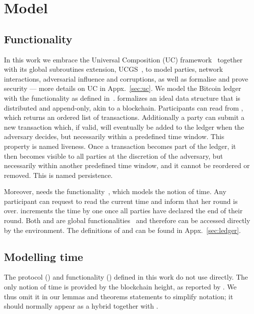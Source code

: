 \section{Model}

  \subsection{\ledger Functionality}
  In this work we embrace the Universal Composition (UC) framework~\cite{uc}
  together with its global subroutines extension,
  UCGS~\cite{DBLP:conf/tcc/BadertscherCHTZ20}, to
  model parties, network interactions, adversarial influence and corruptions, as
  well as formalise and prove security --- more details on UC in
  Appx.~\ref{sec:uc}. We model the Bitcoin ledger with the \ledger
  functionality as defined in~\cite{BMTZ17,genesis}. \ledger formalizes an ideal
  data structure that is
  distributed and append-only, akin to a blockchain. Participants can read from
  \ledger, which returns an ordered list of transactions. Additionally a party
  can submit a new transaction which, if valid, will eventually be added to the
  ledger when the adversary decides, but necessarily within a predefined time
  window. This property is named liveness. Once a transaction becomes part of
  the ledger, it then becomes visible to all parties at the discretion of the
  adversary, but necessarily within another predefined time window, and it
  cannot be reordered or removed. This is named persistence.

  Moreover, \ledger needs the \Fclock
  functionality~\cite{DBLP:conf/tcc/KatzMTZ13}, which models the notion of time.
  Any \Fclock participant can request to read the current time and inform \Fclock that her round is over. \Fclock increments the
  time by one once all parties have declared the end of their round. Both
  \ledger and \Fclock are global
  functionalities~\cite{DBLP:conf/tcc/BadertscherCHTZ20} and therefore can be
  accessed directly by the environment. The definitions of \ledger and \Fclock
  can be found in Appx.~\ref{sec:ledger}.

  \subsection{Modelling time}
  The protocol (\pchan) and functionality (\fchan) defined in this work do not use \Fclock
  directly. The only notion of time is provided by the
  blockchain height, as reported by \ledger. We thus omit it in
  our lemmas and theorems statements to simplify notation; it should
  normally appear as a hybrid together with \ledger.

